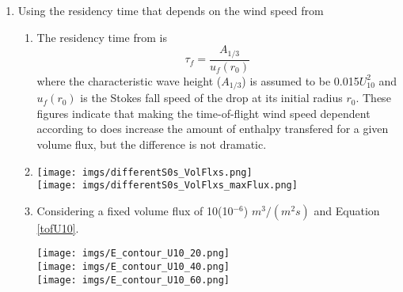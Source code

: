 \documentclass[10pt,a4paper]{article}
\begin{document}
\begin{enumerate}
\item Using the residency time that depends on the wind speed from \cite{Andreas1992}
\begin{enumerate}
\item
The residency time from \citet{Andreas1992} is 
\begin{equation}
\tau_f = \frac{A_{1/3}}{u_f(r_0)}\label{tofU10}
\end{equation}
where the characteristic wave height ($A_{1/3}$) is assumed to be 0.015$U_{10}^2$ and $u_f(r_0)$ is the Stokes fall speed of the drop at its initial radius $r_0$. These figures indicate that making the time-of-flight wind speed dependent according to \citet{Andreas1992} does increase the amount of enthalpy transfered for a given volume flux, but the difference is not dramatic.\\
\item 
\hspace*{-.5in}\texttt{[image: imgs/differentS0s\_VolFlxs.png]}\\
\hspace*{-.5in}\texttt{[image: imgs/differentS0s\_VolFlxs\_maxFlux.png]}\\

\item 
Considering a fixed volume flux of 10(10$^{-6}$) $m^3/(m^2s)$ and Equation \ref{tofU10}.\\
\begin{center}
\texttt{[image: imgs/E\_contour\_U10\_20.png]}\\
\texttt{[image: imgs/E\_contour\_U10\_40.png]}\\
\texttt{[image: imgs/E\_contour\_U10\_60.png]}\\
\end{center}
\end{enumerate}

\end{enumerate}
\end{document}
